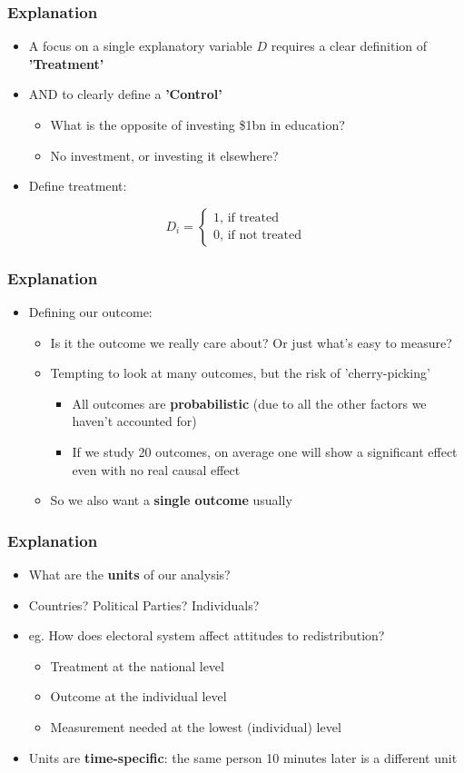 \documentclass[xcolor=x11names,compress]{beamer}\usepackage[]{graphicx}\usepackage[]{color}
\renewcommand{\(}{\begin{columns}}
\renewcommand{\)}{\end{columns}}
\newcommand{\<}[1]{\begin{column}{#1}}
\renewcommand{\>}{\end{column}}
\begin{document}
\begin{frame}
\frametitle{Explanation}
\begin{itemize}
\item A focus on a single explanatory variable $D$ requires a clear definition of \textbf{'Treatment'}
\item AND to clearly define a \textbf{'Control'}
\begin{itemize}
\item What is the opposite of investing \$1bn in education?
\item No investment, or investing it elsewhere?
\end{itemize}
\item Define treatment:
\end{itemize}
\[D_i = 
\begin{cases}
1 \text{, if treated} \\
0 \text{, if not treated}
\end{cases}
\]
\end{frame}

\begin{frame}
\frametitle{Explanation}
\begin{itemize}
\item Defining our outcome:
\begin{itemize}
\item Is it the outcome we really care about? Or just what's easy to measure?
\item Tempting to look at many outcomes, but the risk of 'cherry-picking'
\begin{itemize}
\item All outcomes are \textbf{probabilistic} (due to all the other factors we haven't accounted for)
\item If we study 20 outcomes, on average one will show a significant effect even with no real causal effect
\end{itemize}
\item So we also want a \textbf{single outcome} usually
\end{itemize}
\end{itemize}
\end{frame}

\begin{frame}
\frametitle{Explanation}
\begin{itemize}
\item What are the \textbf{units} of our analysis?
\item Countries? Political Parties? Individuals?
\item eg. How does electoral system affect attitudes to redistribution?
\begin{itemize}
\item Treatment at the national level
\item Outcome at the individual level
\item Measurement needed at the lowest (individual) level
\end{itemize}
\item Units are \textbf{time-specific}: the same person 10 minutes later is a different unit
\end{itemize}
\end{frame}
\end{document}
